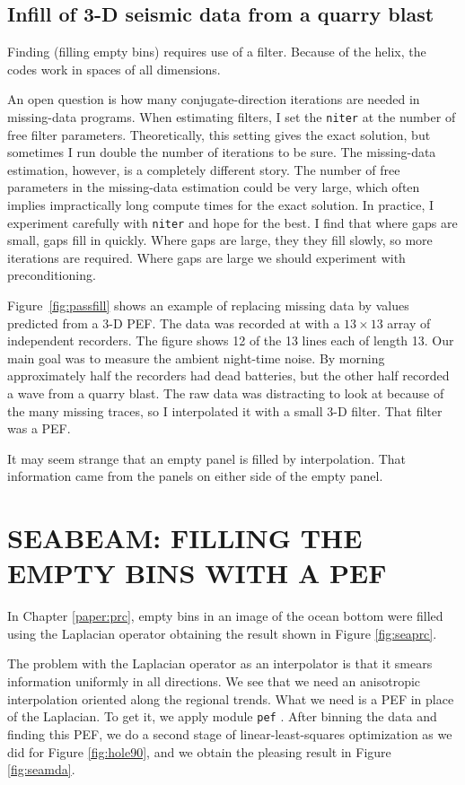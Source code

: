 \subsection{Infill of 3-D seismic data from a quarry blast}

Finding  (filling empty bins) requires use of a filter.
Because of the helix, the codes work in spaces of all dimensions.
\par
An open question is how many conjugate-direction iterations
are needed in missing-data programs.
When estimating filters, I set the  {\tt niter}
at the number of free filter parameters.
Theoretically, this setting gives the exact solution,
but sometimes I run double the number of iterations to be sure.
The missing-data estimation, however, is a completely different story.
The number of free parameters in the missing-data estimation
could be very large,
which often implies impractically long compute times for the exact solution.
In practice, I experiment carefully with
\texttt{niter} and hope for the best.
I find that where gaps are small, gaps fill in quickly.
Where gaps are large, they they fill slowly, so more iterations are required.
Where gaps are large we should experiment with preconditioning.
\par
{}
Figure~\ref{fig:passfill} shows an example of
replacing missing data by values predicted from a 3-D PEF.
The data was recorded at 
with a $13\times 13$ array of independent recorders.
The figure shows 12 of the 13 lines each of length 13.
Our main goal was to measure the ambient night-time noise.
By morning approximately half the recorders had dead batteries,
but the other half recorded a wave from a quarry blast.
The raw data was distracting to look at
because of the many missing traces,
so I interpolated it with a small 3-D filter.
That filter was a PEF.

It may seem strange that an empty panel is filled by interpolation.
That information came from the panels on either side of
the empty panel.

\section{SEABEAM: FILLING THE EMPTY BINS WITH A PEF}
In Chapter \ref{paper:prc},
empty bins in an image of the ocean bottom
were filled using the Laplacian operator
obtaining the result shown in Figure \ref{fig:seaprc}.
\par
The problem with the Laplacian operator as an interpolator
is that it smears information uniformly in all directions.
We see that we need an anisotropic interpolation
oriented along the regional trends.
What we need is a PEF in place of the Laplacian.
To get it,
we apply module \texttt{pef} .
After binning the data and finding this PEF,
we do a second stage of linear-least-squares optimization
as we did for Figure \ref{fig:hole90},
and we obtain the pleasing result in Figure \ref{fig:seamda}.


